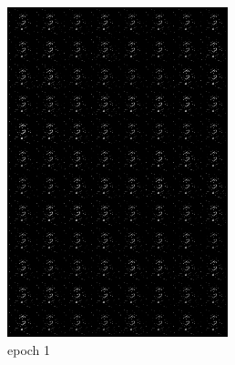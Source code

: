 \documentclass[a4paper]{article}
\theoremstyle{definition}
\newenvironment{soln}{
	\leavevmode\color{blue}\ignorespaces
}{}
\begin{document}
\begin{enumerate} [label=(\alph*)]
\begin{soln}
			\begin{figure}[H]
				\centering
				\begin{subfigure}[b]{0.3\textwidth}
					\centering
					\includegraphics[width=\textwidth]{outputs/gen_img1.png}
					\caption{epoch 1}
				\end{subfigure}
				\hfill
				\begin{subfigure}[b]{0.3\textwidth}
					\centering

\end{subfigure}
\end{figure}
\end{soln}
\end{enumerate}
\end{document}
